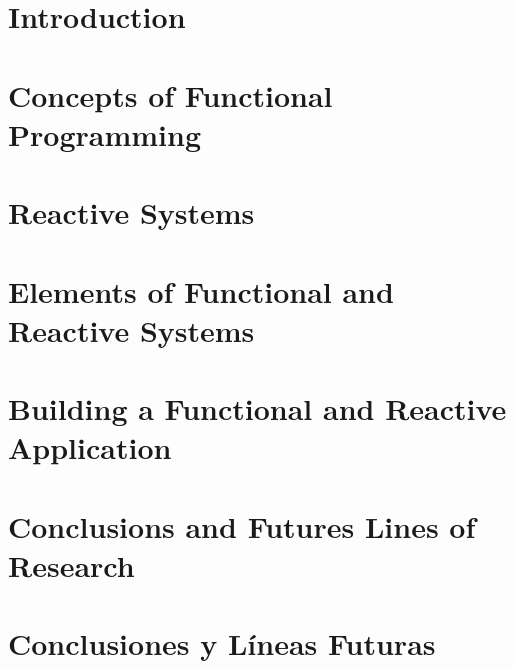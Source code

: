 \documentclass[12pt, a4paper, twoside]{article}
\begin{document}


\clearpage
\setcounter{page}{1}



\newpage



\newpage



\tableofcontents

\section{Introduction}


\section{Concepts of Functional Programming}


\section{Reactive Systems}


\section{Elements of Functional and Reactive Systems}


\section{Building a Functional and Reactive Application}


\section{Conclusions and Futures Lines of Research}


\section{Conclusiones y Líneas Futuras}


\printbibliography
\end{document}
